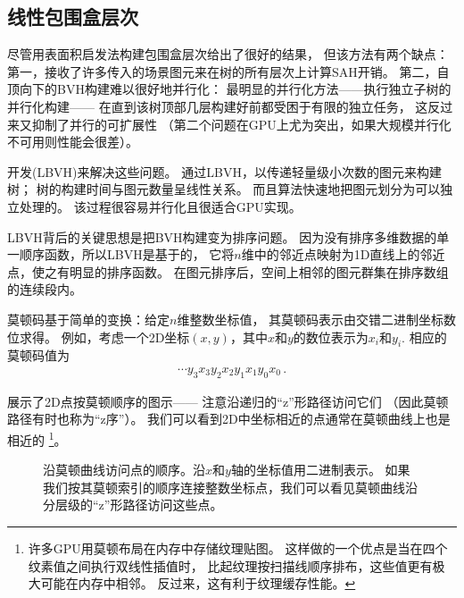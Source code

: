 \subsection{线性包围盒层次}\label{sub:线性包围盒层次}
尽管用表面积启发法构建包围盒层次给出了很好的结果，
但该方法有两个缺点：第一，接收了许多传入的场景图元来在树的所有层次上计算SAH开销。
第二，自顶向下的BVH构建难以很好地并行化：
最明显的并行化方法——执行独立子树的并行化构建——
在直到该树顶部几层构建好前都受困于有限的独立任务，
这反过来又抑制了并行的可扩展性
（第二个问题在GPU上尤为突出，如果大规模并行化不可用则性能会很差）。

开发(LBVH)来解决这些问题。
通过LBVH，以传递轻量级小次数的图元来构建树；
树的构建时间与图元数量呈线性关系。
而且算法快速地把图元划分为可以独立处理的。
该过程很容易并行化且很适合GPU实现。

LBVH背后的关键思想是把BVH构建变为排序问题。
因为没有排序多维数据的单一顺序函数，所以LBVH是基于的，
它将$n$维中的邻近点映射为1D直线上的邻近点，使之有明显的排序函数。
在图元排序后，空间上相邻的图元群集在排序数组的连续段内。

莫顿码基于简单的变换：给定$n$维整数坐标值，
其莫顿码表示由交错二进制坐标数位求得。
例如，考虑一个2D坐标$(x,y)$，其中$x$和$y$的数位表示为$x_i$和$y_i$.
相应的莫顿码值为
\begin{align*}
    \cdots y_3x_3y_2x_2y_1x_1y_0x_0\, .
\end{align*}

展示了2D点按莫顿顺序的图示——
注意沿递归的“z”形路径访问它们
（因此莫顿路径有时也称为“z序”）。
我们可以看到2D中坐标相近的点通常在莫顿曲线上也是相近的
\footnote{许多GPU用莫顿布局在内存中存储纹理贴图。
    这样做的一个优点是当在四个纹素值之间执行双线性插值时，
    比起纹理按扫描线顺序排布，这些值更有极大可能在内存中相邻。
    反过来，这有利于纹理缓存性能。}。
\begin{figure}[htbp]
    \centering
    \caption{沿莫顿曲线访问点的顺序。沿$x$和$y$轴的坐标值用二进制表示。
        如果我们按其莫顿索引的顺序连接整数坐标点，我们可以看见莫顿曲线沿分层级的“z”形路径访问这些点。}
    \label{fig:4.7}
\end{figure}

